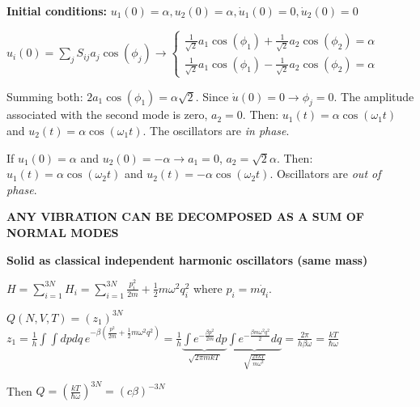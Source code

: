 \documentclass[12pt,a4paper]{report}
\newcommand{\esp}{\vspace{0.5cm}}
\begin{document}
	\esp
	
	\textbf{Initial conditions:} $u_1(0) = \alpha, u_2(0) = \alpha, \dot{u}_1(0) = 0, \dot{u}_2(0) = 0$
	
	\esp
	
	$u_i(0) = \sum_{j} S_{ij} a_j \cos(\phi_j) \to \begin{cases} \frac{1}{\sqrt{2}} a_1 \cos(\phi_1) + \frac{1}{\sqrt{2}} a_2 \cos(\phi_2) = \alpha \\ \frac{1}{\sqrt{2}} a_1 \cos(\phi_1) - \frac{1}{\sqrt{2}} a_2 \cos(\phi_2) = \alpha \end{cases}$
	
	\esp
	
	Summing both: $2 a_1 \cos(\phi_1) = \alpha \sqrt{2}$. Since $\dot{u}(0)=0 \to \phi_j = 0$.
	The amplitude associated with the second mode is zero, $a_2 = 0$.
	Then: $u_1(t) = \alpha \cos(\omega_1 t)$ and $u_2(t) = \alpha \cos(\omega_1 t)$. The oscillators are \textit{in phase}.
	
	\esp
	
	
	\esp
	
	If $u_1(0) = \alpha$ and $u_2(0) = -\alpha \to a_1 = 0$, $a_2 = \sqrt{2}\alpha$.
	Then: $u_1(t) = \alpha \cos(\omega_2 t)$ and $u_2(t) = -\alpha \cos(\omega_2 t)$. Oscillators are \textit{out of phase}.
	
	\esp
	
	\begin{center}
		\textbf{ANY VIBRATION CAN BE DECOMPOSED AS A SUM OF NORMAL MODES}
	\end{center}
	
	\esp
	
	\noindent \textbf{Solid as classical independent harmonic oscillators (same mass)}
	
	\esp
	
	$H = \sum_{i=1}^{3N} H_i = \sum_{i=1}^{3N} \frac{p_i^2}{2m} + \frac{1}{2} m \omega^2 q_i^2$ where $p_i = m \dot{q}_i$.
	
	\esp
	
	$Q(N, V, T) = (z_1)^{3N}$
	$z_1 = \frac{1}{h} \int \int dp dq \, e^{-\beta (\frac{p^2}{2m} + \frac{1}{2} m \omega^2 q^2)} = \frac{1}{h} \underbrace{\int e^{-\frac{\beta p^2}{2m}} dp}_{\sqrt{2\pi m k T}} \underbrace{\int e^{-\frac{\beta m \omega^2 q^2}{2}} dq}_{\sqrt{\frac{2\pi k T}{m \omega^2}}} = \frac{2\pi}{h \beta \omega} = \frac{kT}{\hbar \omega}$
	
	\esp
	
	Then $Q = \left( \frac{kT}{\hbar \omega} \right)^{3N} = (c \beta)^{-3N}$
	
\end{document}
